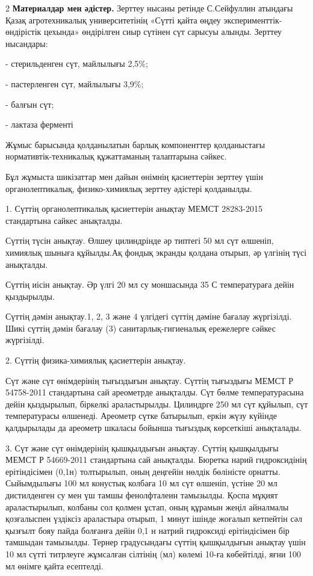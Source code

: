 \begin{multicols}{2}
{\bfseries Материалдар мен әдістер.} Зерттеу нысаны ретінде С.Сейфуллин
атындағы Қазақ агротехникалық университетінің «Сүтті қайта өңдеу
эксперименттік-өндірістік цехында» өндірілген сиыр сүтінен сүт сарысуы
алынды. Зерттеу нысандары:

- стерильденген сүт, майлылығы 2,5\%;

- пастерленген сүт, майлылығы 3,9\%;

- балғын сүт;

- лактаза ферменті

Жұмыс барысында қолданылатын барлық компоненттер қолданыстағы
нормативтік-техникалық құжаттаманың талаптарына сәйкес.

Бұл жұмыста шикізаттар мен дайын өнімнің қасиеттерін зерттеу үшін
органолептикалық, физико-химиялық зерттеу әдістері қолданылды.

1. Сүттің органолептикалық қасиеттерін анықтау МЕМСТ 28283-2015
стандартына сайкес анықталды.

Сүттің түсін анықтау. Өлшеу цилиндрінде әр типтегі 50 мл сүт өлшеніп,
химиялық шыныға құйылды.Ақ фондық экранды қолдана отырып, әр үлгінің
түсі анықталды.

Сүттің иісін анықтау. Әр үлгі 20 мл су моншасында 35
С температураға дейін қыздырылды.

Сүттің дәмін анықтау.1, 2, 3 және 4 үлгідегі сүттің дәміне бағалау
жүргізілді. Шикі сүттің дәмін бағалау (3) санитарлық-гигиеналық
ережелерге сәйкес жүргізілді.

2. Сүттің физика-химиялық қасиеттерін анықтау.

Сүт және сүт өнімдерінің тығыздығын анықтау. Сүттің тығыздығы МЕМСТ Р
54758-2011 стандартына сай ареометрде анықталды. Сүт бөлме
температурасына дейін қыздырылып, біркелкі араластырылды. Цилиндрге 250
мл сүт құйылып, сүт температурасы өлшенеді. Ареометр сүтке батырылып,
еркін жүзу күйінде қалдырылады да ареометр шкаласы бойынша тығыздық
көрсеткіші анықталады.

3. Сүт және сүт өнімдерінің қышқылдығын анықтау. Сүттің қышқылдығы МЕМСТ
Р 54669-2011 стандартына сай анықталды. Бюретка нарий гидроксидінің
ерітіндісімен (0,1н) толтырылып, оның деңгейін нөлдік бөліністе орнатты.
Сыйымдылығы 100 мл конустық колбаға 10 мл сүт өлшеніп, үстіне 20 мл
дистилденген су мен үш тамшы фенолфталеин тамызылды. Қоспа мұқият
араластырылып, колбаны сол қолмен ұстап, оның құрамын жеңіл айналмалы
қозғалыспен үздіксіз араластыра отырып, 1 минут ішінде жоғалып кетпейтін
сәл қызғылт бояу пайда болғанға дейін 0,1 н натрий гидроксиді
ерітіндісімен бір тамшыдан тамызылды. Тернер градусындағы сүттің
қышқылдығын анықтау үшін 10 мл сүтті титрлеуге жұмсалған сілтінің (мл)
көлемі 10-ға көбейтілді, яғни 100 мл өнімге қайта есептелді.


\end{multicols}
